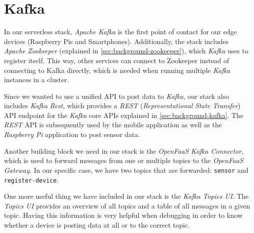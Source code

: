 \section{Kafka}

In our serverless stack, \textit{Apache Kafka} is the first point of contact for our edge devices
(Raspberry Pis and Smartphones). Additionally, the stack includes \textit{Apache Zookeeper}
(explained in \autoref{sec:background-zookeeper}), which \textit{Kafka} uses to register itself.
This way, other services can connect to Zookeeper instead of connecting to Kafka directly, which is
needed when running multiple \textit{Kafka} instances in a cluster.

Since we wanted to use a unified API to post data to \textit{Kafka}, our stack also includes
\textit{Kafka Rest}, which provides a \textit{REST} (\textit{Representational State Transfer}) API
endpoint for the \textit{Kafka} core APIs explained in \autoref{sec:background-kafka}. The
\textit{REST} API is subsequently used by the mobile application as well as the \textit{Raspberry Pi}
application to post sensor data.

Another building block we need in our stack is the \textit{OpenFaaS Kafka Connector}, which is used
to forward messages from one or multiple topics to the \textit{OpenFaaS Gateway}. In our specific
case, we have two topics that are forwarded: \texttt{sensor} and \texttt{register-device}.

One more useful thing we have included in our stack is the \textit{Kafka Topics UI}. The
\textit{Topics UI} provides an overview of all topics and a table of all messages in a given topic.
Having this information is very helpful when debugging in order to know whether a device is posting
data at all or to the correct topic.
